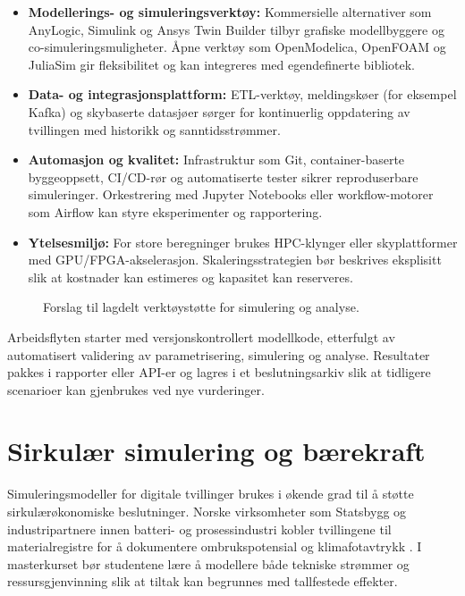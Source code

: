 \begin{itemize}
    \item \textbf{Modellerings- og simuleringsverktøy:} Kommersielle alternativer som AnyLogic, Simulink og Ansys Twin Builder tilbyr grafiske modellbyggere og co-simuleringsmuligheter. Åpne verktøy som OpenModelica, OpenFOAM og JuliaSim gir fleksibilitet og kan integreres med egendefinerte bibliotek.
    \item \textbf{Data- og integrasjonsplattform:} ETL-verktøy, meldingskøer (for eksempel Kafka) og skybaserte datasjøer sørger for kontinuerlig oppdatering av tvillingen med historikk og sanntidsstrømmer.
    \item \textbf{Automasjon og kvalitet:} Infrastruktur som Git, container-baserte byggeoppsett, CI/CD-rør og automatiserte tester sikrer reproduserbare simuleringer. Orkestrering med Jupyter Notebooks eller workflow-motorer som Airflow kan styre eksperimenter og rapportering.
    \item \textbf{Ytelsesmiljø:} For store beregninger brukes HPC-klynger eller skyplattformer med GPU/FPGA-akselerasjon. Skaleringsstrategien bør beskrives eksplisitt slik at kostnader kan estimeres og kapasitet kan reserveres.
\end{itemize}

\begin{figure}[htbp]
    \centering
    \caption{Forslag til lagdelt verktøystøtte for simulering og analyse.}
    \label{fig:kap04-verktoystakk}
\end{figure}

Arbeidsflyten starter med versjonskontrollert modellkode, etterfulgt av automatisert validering av parametrisering, simulering og analyse. Resultater pakkes i rapporter eller API-er og lagres i et beslutningsarkiv slik at tidligere scenarioer kan gjenbrukes ved nye vurderinger.

\section{Sirkulær simulering og bærekraft}
Simuleringsmodeller for digitale tvillinger brukes i økende grad til å støtte sirkulærøkonomiske beslutninger. Norske virksomheter som Statsbygg og industripartnere innen batteri- og prosessindustri kobler tvillingene til materialregistre for å dokumentere ombrukspotensial og klimafotavtrykk \citep{statsbygg2022ombruk,statsbygg2023loopfront}. I masterkurset bør studentene lære å modellere både tekniske strømmer og ressursgjenvinning slik at tiltak kan begrunnes med tallfestede effekter.

